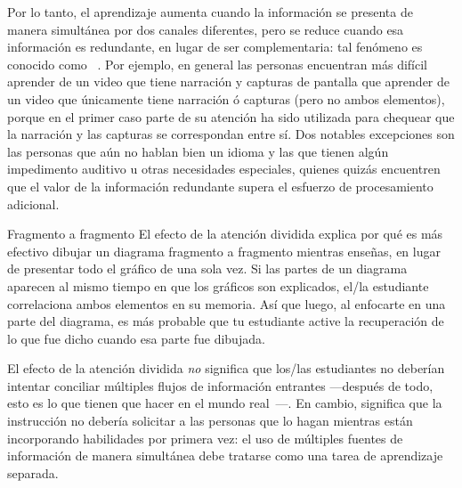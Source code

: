 Por lo tanto, el aprendizaje aumenta cuando la información se presenta de manera simultánea por dos canales diferentes,
pero se reduce cuando esa información es redundante, en lugar de ser complementaria:
tal fenómeno es conocido como ~\cite{Maye2003}.
Por ejemplo, en general las personas encuentran más difícil aprender de un video que tiene narración y
capturas de pantalla que aprender de un video que únicamente tiene narración ó capturas (pero no ambos elementos),
porque en el primer caso parte de su atención ha sido utilizada para chequear que la narración  
y las capturas se correspondan entre sí. Dos notables excepciones 
son las personas que aún no hablan bien un idioma y las que tienen algún impedimento auditivo u
otras necesidades especiales, quienes quizás encuentren que el valor de la información redundante
supera el esfuerzo de procesamiento adicional.

\begin{aside}{Fragmento a fragmento}
  El efecto de la atención dividida explica por qué es más efectivo dibujar un diagrama
  fragmento a fragmento mientras enseñas, en lugar de presentar todo el gráfico de una sola vez.
  Si las partes de un diagrama aparecen al mismo tiempo en que los gráficos son explicados,
  el/la estudiante correlaciona ambos elementos en su memoria.
  Así que luego, al enfocarte en una parte del diagrama, es más probable que tu estudiante active la recuperación
  de lo que fue dicho cuando esa parte fue dibujada.
\end{aside}

El efecto de la atención dividida \emph{no} significa
que los/las estudiantes no deberían intentar conciliar múltiples flujos de información entrantes 
—después de todo, esto es lo que tienen que hacer en el mundo real~\cite{Atki2000}—.
En cambio, significa que la instrucción no debería solicitar a las personas
que lo hagan mientras están incorporando habilidades por primera vez:
el uso de múltiples fuentes de información de manera simultánea debe tratarse como una tarea de aprendizaje separada.

